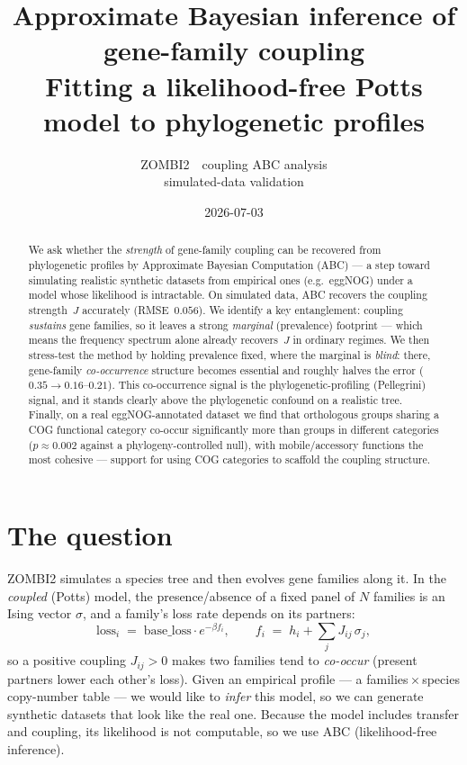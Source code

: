 \documentclass[11pt]{article}
\title{\vspace{-1.5em}\textbf{\Large Approximate Bayesian inference of gene-family coupling}\\[0.35em]
  \large Fitting a likelihood-free Potts model to phylogenetic profiles}
\author{ZOMBI2 \,\textbullet\, coupling ABC analysis\\ \small\color{muted} simulated-data validation}
\date{\small 2026-07-03}
\begin{document}
\maketitle
\vspace{-1.6em}

\begin{abstract}\noindent
We ask whether the \emph{strength} of gene-family coupling can be recovered from
phylogenetic profiles by Approximate Bayesian Computation (ABC) --- a step toward simulating
realistic synthetic datasets from empirical ones (e.g.\ eggNOG) under a model whose likelihood
is intractable. On simulated data, ABC recovers the coupling strength~$J$ accurately
(RMSE~$0.056$). We identify a key entanglement: coupling \emph{sustains} gene families, so it
leaves a strong \emph{marginal} (prevalence) footprint --- which means the frequency spectrum
alone already recovers~$J$ in ordinary regimes. We then stress-test the method by holding
prevalence fixed, where the marginal is \emph{blind}: there, gene-family \emph{co-occurrence}
structure becomes essential and roughly halves the error ($0.35\!\to\!0.16$--$0.21$). This
co-occurrence signal is the phylogenetic-profiling (Pellegrini) signal, and it stands clearly
above the phylogenetic confound on a realistic tree. Finally, on a real eggNOG-annotated dataset we
find that orthologous groups sharing a COG functional category co-occur significantly more than
groups in different categories ($p\approx0.002$ against a phylogeny-controlled null), with
mobile/accessory functions the most cohesive --- support for using COG categories to scaffold the
coupling structure.
\end{abstract}

\section{The question}

ZOMBI2 simulates a species tree and then evolves gene families along it. In the
\emph{coupled} (Potts) model, the presence/absence of a fixed panel of $N$ families is an
Ising vector $\sigma$, and a family's loss rate depends on its partners:
\[
\text{loss}_i \;=\; \text{base\_loss}\cdot e^{-\beta f_i},\qquad
f_i \;=\; h_i + \textstyle\sum_j J_{ij}\,\sigma_j ,
\]
so a positive coupling $J_{ij}>0$ makes two families tend to \emph{co-occur} (present partners
lower each other's loss). Given an empirical profile --- a families\,$\times$\,species
copy-number table --- we would like to \emph{infer} this model, so we can generate synthetic
datasets that look like the real one. Because the model includes transfer and coupling, its
likelihood is not computable, so we use ABC (likelihood-free inference).
\end{document}
